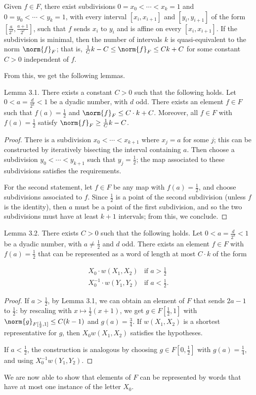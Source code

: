 Given $f\in F$, there exist subdivisions $0=x_0<\cdots<x_k=1$ and $0=y_0<\cdots<y_k=1$, with every interval $[x_i,x_{i+1}]$ and $[y_i,y_{i+1}]$ of the form $[\frac a{2^\ell},\frac{a+1}{2^\ell}]$, such that $f$ sends $x_i$ to $y_i$ and is affine on every $[x_i,x_{i+1}]$. If the subdivision is minimal, then the number of intervals $k$ is quasi-equivalent to the norm $\norm{f}_F$; that is, $\frac1Ck-C\le\norm{f}_F\le Ck+C$ for some constant $C>0$ independent of $f$.

From this, we get the following lemmas.
\begin{authorstatement}{Lemma 3.1.}
There exists a constant $C>0$ such that the following holds. Let $0<a=\frac d{2^k}<1$ be a dyadic number, with $d$ odd. There exists an element $f\in F$ such that $f(a)=\frac12$ and $\norm{f}_F\le C\cdot k+C$. Moreover, all $f\in F$ with $f(a)=\frac12$ satisfy $\norm{f}_F\ge\frac1Ck-C$.
\end{authorstatement}
\begin{proof}
There is a subdivision $x_0<\cdots<x_{k+1}$ where $x_j=a$ for some $j$; this can be constructed by iteratively bisecting the interval containing $a$. Then choose a subdivision $y_0<\cdots<y_{k+1}$ such that $y_j=\frac12$; the map associated to these subdivisions satisfies the requirements.

For the second statement, let $f\in F$ be any map with $f(a)=\frac12$, and choose subdivisions associated to $f$. Since $\frac12$ is a point of the second subdivision (unless $f$ is the identity), then $a$ must be a point of the first subdivision, and so the two subdivisions must have at least $k+1$ intervals; from this, we conclude.
\end{proof}
\begin{authorstatement}{Lemma 3.2.}
There exists $C>0$ such that the following holds. Let $0<a=\frac d{2^k}<1$ be a dyadic number, with $a\ne\frac12$ and $d$ odd. There exists an element $f\in F$ with $f(a)=\frac12$ that can be represented as a word of length at most $C\cdot k$ of the form
\end{authorstatement}
\[
\begin{array}{ll}
X_0\cdot w(X_1,X_2)&\text{if }a>\frac12\\
X_0^{-1}\cdot w(Y_1,Y_2)&\text{if }a<\frac12.
\end{array}
\]
\begin{proof}
If $a>\frac12$, by Lemma 3.1, we can obtain an element of $F$ that sends $2a-1$ to $\frac12$: by rescaling with $x\mapsto\frac12(x+1)$, we get $g\in F[\frac12,1]$ with $\norm{g}_{F[\frac12,1]}\le C(k-1)$ and $g(a)=\frac34$. If $w(X_1,X_2)$ is a shortest representative for $g$, then $X_0w(X_1,X_2)$ satisfies the hypotheses.

If $a<\frac12$, the construction is analogous by choosing $g\in F[0,\frac12]$ with $g(a)=\frac14$, and using $X_0^{-1}w(Y_1,Y_2)$.
\end{proof}
We are now able to show that elements of $F$ can be represented by words that have at most one instance of the letter $X_0$.

